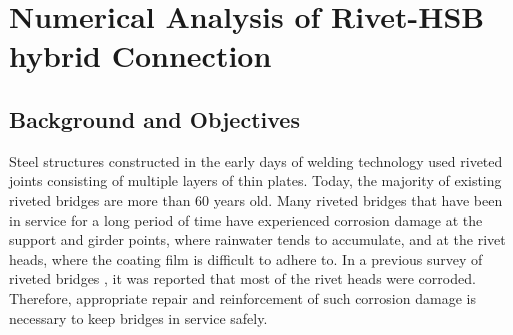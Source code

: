 \chapter{Numerical Analysis of Rivet-HSB hybrid Connection}
\label{ch3}

\begin{spacing}{1.25} %
\minitoc %
\end{spacing} %
\onehalfspacing %



\section{Background and Objectives}

Steel structures constructed in the early days of welding technology used riveted joints consisting of multiple layers of thin plates. Today, the majority of existing riveted bridges are more than 60 years old. Many riveted bridges that have been in service for a long period of time have experienced corrosion damage at the support and girder points, where rainwater tends to accumulate, and at the rivet heads, where the coating film is difficult to adhere to. In a previous survey of riveted bridges \cite{okamoto2011investigation}, it was reported that most of the rivet heads were corroded. Therefore, appropriate repair and reinforcement of such corrosion damage is necessary to keep bridges in service safely.

